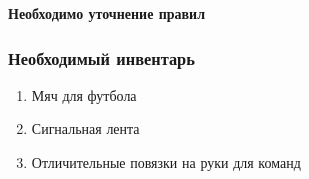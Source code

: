 
\par \textbf{Необходимо уточнение правил}

\subsubsection*{Необходимый инвентарь}
\begin{enumerate}
\item Мяч для футбола
\item Сигнальная лента
\item Отличительные повязки на руки для команд
\end{enumerate}